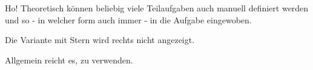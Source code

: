 \begin{task}{Ho!}
   Theoretisch können beliebig viele Teilaufgaben auch manuell definiert werden und so - in welcher form auch immer - in die Aufgabe eingewoben.

   Die Variante mit Stern wird rechts nicht angezeigt.

   Allgemein reicht es, \string\Subtask\space zu verwenden.
\end{task}